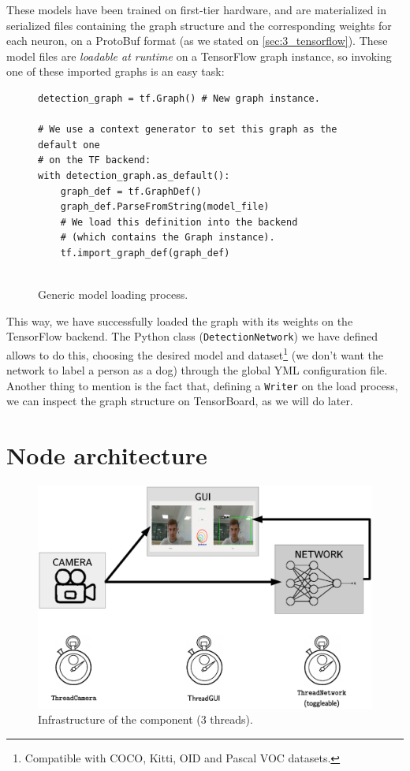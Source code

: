 	
	These models have been trained on first-tier hardware, and are materialized in serialized files containing the graph structure and the corresponding weights for each neuron, on a ProtoBuf format (as we stated on \autoref{sec:3_tensorflow}). These model files are \textit{loadable at runtime} on a TensorFlow graph instance, so invoking one of these imported graphs is an easy task:
	\begin{figure}[h]
		\begin{lstlisting}
detection_graph = tf.Graph() # New graph instance.

# We use a context generator to set this graph as the default one
# on the TF backend:
with detection_graph.as_default():
	graph_def = tf.GraphDef()
	graph_def.ParseFromString(model_file)
	# We load this definition into the backend
	# (which contains the Graph instance).
	tf.import_graph_def(graph_def)
	
		\end{lstlisting}
		\caption{Generic model loading process.}
		\label{fig:5_load_model}
	\end{figure}

	
This way, we have successfully loaded the graph with its weights on the TensorFlow backend. The Python class (\texttt{DetectionNetwork}) we have defined allows to do this, choosing the desired model and dataset\footnote{Compatible with COCO, Kitti, OID and Pascal VOC datasets.} (we don't want the network to label a person as a dog) through the global YML configuration file.\\

Another thing to mention is the fact that, defining a \texttt{Writer} on the load process, we can inspect the graph structure on TensorBoard, as we will do later.

\section{Node architecture}
	\label{sec:5_node_architecture}
	\begin{figure}[h]
		\centering
		\includegraphics[width=4.5in]{images/objectdetector_infrastructure}
		\caption{Infrastructure of the component (3 threads).}
	\end{figure}
	
